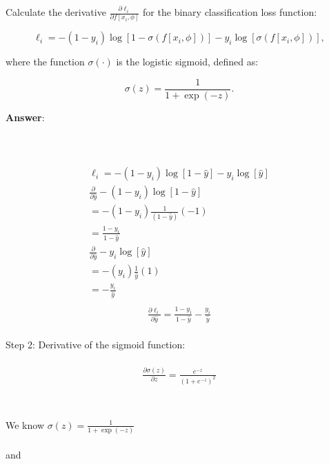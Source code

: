 \documentclass[10pt]{article}
\begin{document}
Calculate the derivative \( \frac{\partial \ell_i}{\partial f[x_i, \phi]} \) for the binary 
classification loss function:

\begin{equation}
\ell_i = -(1 - y_i) \log [1 - \sigma(f[x_i, \phi])] - y_i \log [\sigma(f[x_i, \phi])],
\end{equation}

where the function \( \sigma(\cdot) \) is the logistic sigmoid, defined as:

\begin{equation}
\sigma(z) = \frac{1}{1 + \exp(-z)}.
\end{equation}

\textbf{Answer}:  \\ \\ 
\\ \\ 
\begin{align*}
    \ell_i = -(1 - y_i) \log [1 - \hat{y}] - y_i \log [\hat{y}] \\ 
    \frac{\partial}{\partial \hat{y}} -(1 - y_i) \log [1 - \hat{y}] \\
    = -(1 - y_{i}) \frac{1}{(1- \hat{y})}(-1) \\ 
    = \frac{1-y_{i}}{1 - \hat{y}} \tag{4} \\ 
    \frac{\partial}{\partial \hat{y}} - y_i \log [\hat{y}] \\
    = -(y_{i})\frac{1}{\hat{y}}(1) \\ 
    = -\frac{y_{i}}{\hat{y}} \tag{5}  \\ 
\end{align*}
\begin{align*}
    \frac{\partial \ell_i}{\partial \hat{y}} = \frac{1-y_{i}}{1 - \hat{y}} -\frac{y_{i}}{\hat{y}}
\end{align*} \\ 
Step 2: Derivative of the sigmoid function:\\ \\ 
\begin{align*}
    \frac{\partial \sigma(z)}{\partial z} = \frac{e^{-z}}{(1 + e^{-z})^{2}} \\  
\end{align*}
\\ \\ 
We know $\sigma(z) = \frac{1}{1 + \exp(-z)}$ \\ \\ and \\ \\ 
\end{document}
